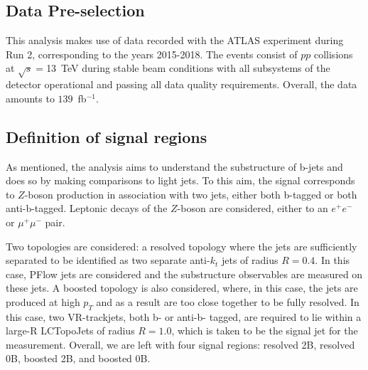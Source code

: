 \documentclass[10pt,a4paper]{book}
\begin{document}
\subsection{Data Pre-selection}

This analysis makes use of data recorded with the ATLAS experiment during Run 2, corresponding to the years 2015-2018. The events consist of $pp$ collisions at $\sqrt{s} = $13~TeV during stable beam conditions with all subsystems of the detector operational and passing all data quality requirements. Overall, the data amounts to $139$~fb$^{-1}$. 

\subsection{Definition of signal regions}

As mentioned, the analysis aims to understand the substructure of b-jets and does so by making comparisons to light jets. To this aim, the signal corresponds to $Z$-boson production in association with two jets, either both b-tagged or both anti-b-tagged. Leptonic decays of the $Z$-boson are considered, either to an $e^+e^-$ or $\mu^+\mu^-$ pair. 

Two topologies are considered: a resolved topology where the jets are sufficiently separated to be identified as two separate anti-$k_t$ jets of radius $R = 0.4$. In this case, PFlow jets are considered and the substructure observables are measured on these jets. A boosted topology is also considered, where, in this case, the jets are produced at high $p_T$ and as a result are too close together to be fully resolved. In this case, two VR-trackjets, both b- or anti-b- tagged, are required to lie within a large-R LCTopoJets of radius $R = 1.0$, which is taken to be the signal jet for the measurement. Overall, we are left with four signal regions: resolved 2B, resolved 0B, boosted 2B, and boosted 0B.
\end{document}
